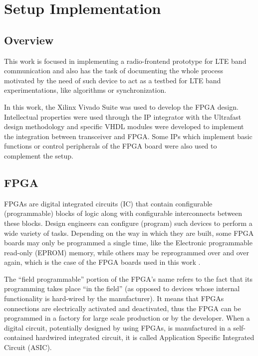 \chapter{Setup Implementation}
\label{chap:implementation}

\section{Overview}

This work is focused in implementing a radio-frontend prototype for LTE band
communication and also has the task of documenting the whole process motivated
by the need of such device to act as a testbed for LTE band experimentations,
like algorithms or synchronization.

In this work, the Xilinx Vivado Suite was used to develop the FPGA design.
Intellectual properties were used through the IP integrator with the Ultrafast
design methodology \cite{xilinx:ultrafast} and specific VHDL modules were
developed to implement the integration between transceiver and FPGA. Some IPs
which implement basic functions or control peripherals of the FPGA board were
also used to complement the setup.

\section{FPGA}

FPGAs are digital integrated circuits (IC) that contain configurable
(programmable) blocks of logic along with configurable interconnects between
these blocks. Design engineers can configure (program) such devices to perform a
wide variety of tasks. Depending on the way in which they are built, some FPGA
boards may only be programmed a single time, like the Electronic programmable
read-only (EPROM) memory, while others may be reprogrammed over and over again,
which is the case of the FPGA boards used in this work \cite{max2004}.

The “field programmable” portion of the FPGA’s name refers to the fact that its
programming takes place “in the field” (as opposed to devices whose internal
functionality is hard-wired by the manufacturer). It means that FPGAs
connections are electrically activated and deactivated, thus the FPGA can be
programmed in a factory for large scale production or by the developer. When a
digital circuit, potentially designed by using FPGAs, is manufactured in a
self-contained hardwired integrated circuit, it is called Application Specific
Integrated Circuit (ASIC).

